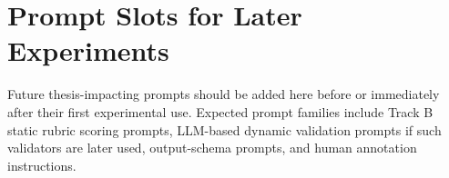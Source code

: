 \section{Prompt Slots for Later Experiments}
\label{app:future-prompt-slots}

Future thesis-impacting prompts should be added here before or immediately after
their first experimental use. Expected prompt families include Track B static
rubric scoring prompts, LLM-based dynamic validation prompts if such validators
are later used, output-schema prompts, and human annotation instructions.
